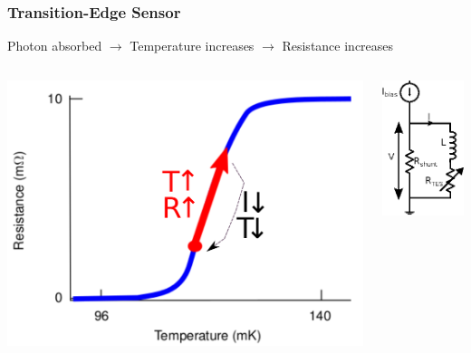\begin{frame}\frametitle{Transition-Edge Sensor}
    
  Photon absorbed $\rightarrow$ Temperature increases $\rightarrow$ Resistance increases

  \begin{columns}
    \begin{center}
    \includegraphics[width=1.2\linewidth]{images/tes_principle/TES.pdf}
    \end{center}
    \begin{center}
    \includegraphics[width=0.5\linewidth]{images/electronics/tes_only_electronics.eps}
    \end{center}
  \end{columns}
\end{frame}

